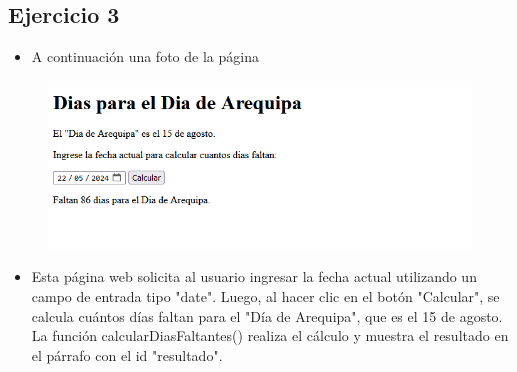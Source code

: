 \documentclass{article}
\begin{document}
	\subsection{Ejercicio 3}
		
	\begin{itemize}
			\item A continuación una foto de la página
		\end{itemize} 
		\begin{figure}[H]
			\centering
			\includegraphics[width=1.0\textwidth,keepaspectratio]{img/ejercicio3.PNG}
		\end{figure}
		\begin{itemize}
			\item Esta página web solicita al usuario ingresar la fecha actual utilizando un campo de entrada tipo "date". Luego, al hacer clic en el botón "Calcular", se calcula cuántos días faltan para el "Día de Arequipa", que es el 15 de agosto. La función calcularDiasFaltantes() realiza el cálculo y muestra el resultado en el párrafo con el id "resultado".
		\end{itemize} 
\end{document}
